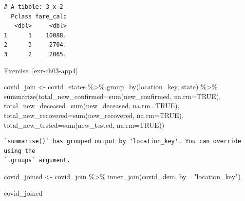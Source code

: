 \documentclass[
  letterpaper,
  DIV=11,
  numbers=noendperiod]{scrreprt}
\newenvironment{Shaded}{\begin{snugshade}}{\end{snugshade}}
\newcommand{\AttributeTok}[1]{\textcolor[rgb]{0.40,0.45,0.13}{#1}}
\newcommand{\ConstantTok}[1]{\textcolor[rgb]{0.56,0.35,0.01}{#1}}
\newcommand{\FunctionTok}[1]{\textcolor[rgb]{0.28,0.35,0.67}{#1}}
\newcommand{\NormalTok}[1]{\textcolor[rgb]{0.00,0.23,0.31}{#1}}
\newcommand{\OtherTok}[1]{\textcolor[rgb]{0.00,0.23,0.31}{#1}}
\newcommand{\SpecialCharTok}[1]{\textcolor[rgb]{0.37,0.37,0.37}{#1}}
\newcommand{\StringTok}[1]{\textcolor[rgb]{0.13,0.47,0.30}{#1}}
\theoremstyle{definition}
\theoremstyle{remark}
\begin{document}
\begin{verbatim}
# A tibble: 3 x 2
  Pclass fare_calc
   <dbl>     <dbl>
1      1    10088.
2      3     2704.
3      2     2065.
\end{verbatim}

Exercise~\ref{exr-ch03-app4}

\begin{Shaded}
\begin{Highlighting}[]
\NormalTok{covid\_join }\OtherTok{\textless{}{-}}\NormalTok{ covid\_states }\SpecialCharTok{\%\textgreater{}\%}
 \FunctionTok{group\_by}\NormalTok{(location\_key, state) }\SpecialCharTok{\%\textgreater{}\%}
 \FunctionTok{summarize}\NormalTok{(}\AttributeTok{total\_new\_confirmed=}\FunctionTok{sum}\NormalTok{(new\_confirmed, }\AttributeTok{na.rm=}\ConstantTok{TRUE}\NormalTok{),}
           \AttributeTok{total\_new\_deceased=}\FunctionTok{sum}\NormalTok{(new\_deceased, }\AttributeTok{na.rm=}\ConstantTok{TRUE}\NormalTok{),}
           \AttributeTok{total\_new\_recovered=}\FunctionTok{sum}\NormalTok{(new\_recovered, }\AttributeTok{na.rm=}\ConstantTok{TRUE}\NormalTok{),}
           \AttributeTok{total\_new\_tested=}\FunctionTok{sum}\NormalTok{(new\_tested, }\AttributeTok{na.rm=}\ConstantTok{TRUE}\NormalTok{))}
\end{Highlighting}
\end{Shaded}

\begin{verbatim}
`summarise()` has grouped output by 'location_key'. You can override using the
`.groups` argument.
\end{verbatim}

\begin{Shaded}
\begin{Highlighting}[]
\NormalTok{covid\_joined }\OtherTok{\textless{}{-}}\NormalTok{ covid\_join }\SpecialCharTok{\%\textgreater{}\%}
  \FunctionTok{inner\_join}\NormalTok{(covid\_dem, }\AttributeTok{by=} \StringTok{"location\_key"}\NormalTok{)}

\NormalTok{covid\_joined}
\end{Highlighting}
\end{Shaded}
\end{document}
